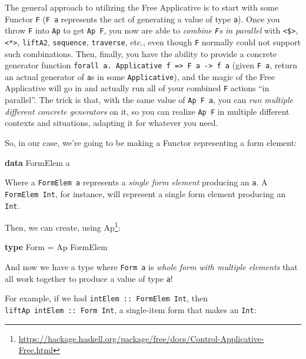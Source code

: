 \documentclass[]{article}
\newenvironment{Shaded}{}{}
\newcommand{\DataTypeTok}[1]{\textcolor[rgb]{0.56,0.13,0.00}{#1}}
\newcommand{\FunctionTok}[1]{\textcolor[rgb]{0.02,0.16,0.49}{#1}}
\newcommand{\KeywordTok}[1]{\textcolor[rgb]{0.00,0.44,0.13}{\textbf{#1}}}
\newcommand{\NormalTok}[1]{#1}
\renewcommand{\href}[2]{#2\footnote{\url{#1}}}
\begin{document}
The general approach to utilizing the Free Applicative is to start with some
Functor \texttt{F} (\texttt{F\ a} represents the act of generating a value of
type \texttt{a}). Once you throw \texttt{F} into \texttt{Ap} to get
\texttt{Ap\ F}, you now are able to \emph{combine \texttt{F}s in parallel} with
\texttt{\textless{}\$\textgreater{}}, \texttt{\textless{}*\textgreater{}},
\texttt{liftA2}, \texttt{sequence}, \texttt{traverse}, etc., even though
\texttt{F} normally could not support such combinations. Then, finally, you have
the ability to provide a concrete generator function
\texttt{forall\ a.\ Applicative\ f\ =\textgreater{}\ F\ a\ -\textgreater{}\ f\ a}
(given \texttt{F\ a}, return an actual generator of \texttt{a}s in some
\texttt{Applicative}), and the magic of the Free Applicative will go in and
actually run all of your combined \texttt{F} actions ``in parallel''. The trick
is that, with the same value of \texttt{Ap\ F\ a}, you can \emph{run multiple
different concrete generators} on it, so you can realize \texttt{Ap\ F} in
multiple different contexts and situations, adapting it for whatever you need.

So, in our case, we're going to be making a Functor representing a form element:

\begin{Shaded}
\begin{Highlighting}[]
\KeywordTok{data} \DataTypeTok{FormElem}\NormalTok{ a}
\end{Highlighting}
\end{Shaded}

Where a \texttt{FormElem\ a} represents a \emph{single form element} producing
an \texttt{a}. A \texttt{FormElem\ Int}, for instance, will represent a single
form element producing an \texttt{Int}.

Then, we can create, using
\href{https://hackage.haskell.org/package/free/docs/Control-Applicative-Free.html}{Ap}:

\begin{Shaded}
\begin{Highlighting}[]
\KeywordTok{type} \DataTypeTok{Form} \FunctionTok{=} \DataTypeTok{Ap} \DataTypeTok{FormElem}
\end{Highlighting}
\end{Shaded}

And now we have a type where \texttt{Form\ a} is \emph{whole form with multiple
elements} that all work together to produce a value of type \texttt{a}!

For example, if we had \texttt{intElem\ ::\ FormElem\ Int}, then
\texttt{liftAp\ intElem\ ::\ Form\ Int}, a single-item form that makes an
\texttt{Int}:
\end{document}

